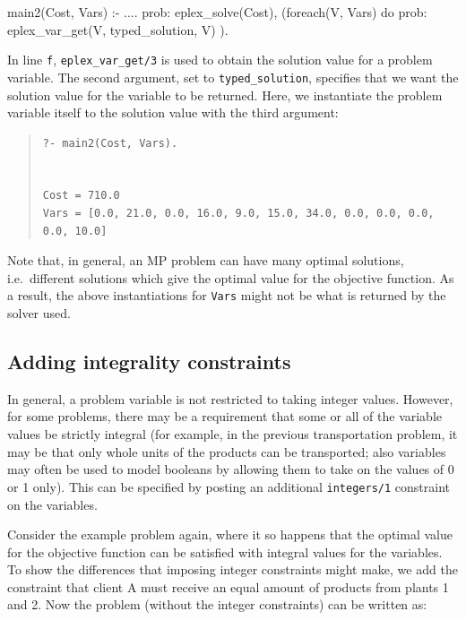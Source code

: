 {\small
\begin{code}
main2(Cost, Vars) :-
        ....  %
        prob: eplex_solve(Cost),  %
        (foreach(V, Vars) do
            prob: eplex_var_get(V, typed_solution, V) 
        ).
\end{code}}

In line \verb'f', \verb'eplex_var_get/3' is used to obtain the solution
value for a problem variable. The second argument, set to \verb'typed_solution', 
 specifies that we want the solution value for the variable to be returned.
Here, we instantiate the problem variable itself to the solution value
with the third argument:

\begin{quote}\begin{verbatim}
?- main2(Cost, Vars).


Cost = 710.0
Vars = [0.0, 21.0, 0.0, 16.0, 9.0, 15.0, 34.0, 0.0, 0.0, 0.0, 0.0, 10.0]
\end{verbatim}\end{quote}

Note that, in general, an MP problem can have many optimal solutions, i.e.\
different solutions which give the optimal value for the objective function.
As a result, the above
instantiations for \verb'Vars' might not be what is returned by the solver
used.


\subsection{Adding integrality constraints}

In general, a problem variable is not restricted to taking integer
values. However, for some problems, there may be a requirement that some or
all of the variable values be strictly integral (for example, in the previous
transportation problem, it may be that only whole units of the
products can be transported; also variables may often be used to model
booleans by allowing them to take on the values of 0 or 1 only). 
This can be specified  by
posting an additional \verb'integers/1' constraint on the
variables. 

Consider the example problem again, where it so happens that the
optimal value for the objective function can be satisfied with integral
values for the variables. To show the differences
that imposing integer constraints might make, we add the constraint that
client A must receive an equal amount of products from plants 1 and 2. Now
the problem (without the integer constraints) can be written as:

